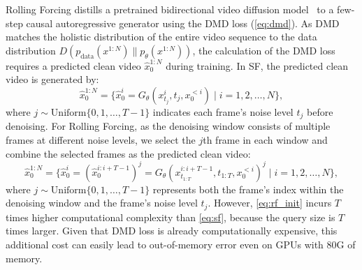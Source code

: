 Rolling Forcing distills a pretrained bidirectional video diffusion model~\citep{wan2025wan} to a few-step causal autoregressive generator using the DMD loss (\cref{eq:dmd}). As DMD matches the holistic distribution of the entire video sequence to the data distribution $D(p_{\text{data}}(x^{1:N}) \| p_\theta(x^{1:N}))$, the calculation of the DMD loss requires a predicted clean video $\hat{x}_0^{1:N}$ during training. In SF, the predicted clean video is generated by: 
\begin{equation}
\label{eq:sf}
 \hat{x}_0^{1:N} = \Big\{ 
 \hat{x}^i_0= G_\theta(x^{i}_{t_j}, t_j, x^{<i}_0) 
 \mid i=1,2,\dots,N
 \Big\},
\end{equation}
where $j \sim \text{Uniform}\{0,1,\dots,T-1\}$ indicates each frame's noise level $t_j$ before denoising.
For Rolling Forcing, as the denoising window consists of multiple frames at different noise levels, we select the $j$th frame in each window and combine the selected frames as the predicted clean video:
\begin{equation}
\label{eq:rf_init}
    \hat{x}_0^{1:N} = \Big\{ 
    \hat{x}^i_0 = (\hat{x}^{i:i+T-1}_0)^j = 
    G_\theta(x^{i:i+T-1}_{t_{1:T}}, t_{1:T},  x^{<i}_0)^j 
    \mid i=1,2,\dots,N
    \Big\}, 
\end{equation}
where $j \sim \text{Uniform}\{0,1,\dots,T-1\}$ represents both the frame's index within the denoising window and the frame's noise level $t_j$. However, \cref{eq:rf_init} incurs $T$ times higher computational complexity than \cref{eq:sf}, because the query size is $T$ times larger. Given that DMD loss is already computationally expensive, this additional cost can easily lead to out-of-memory error even on GPUs with 80G of memory. 


